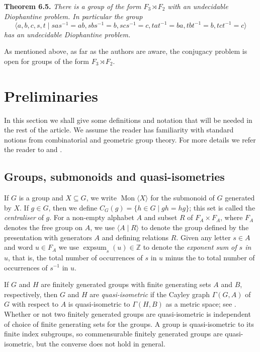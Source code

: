 \documentclass[11pt]{amsart}
\theoremstyle{definition}
\numberwithin{theorem}{section}
\DeclareMathOperator{\Mon}{Mon}
\DeclareMathOperator{\expsum}{expsum}
\begin{document}
\textbf{Theorem 6.5.}
\emph{There is a group of the form $F_3 \rtimes F_2$ with an undecidable Diophantine problem. In particular the group
\[
\langle a, b,c, s, t \mid sas^{-1} = ab, sbs^{-1} = b, scs^{-1} = c, tat^{-1} = ba, tbt^{-1} = b, tct^{-1} = c \rangle
\]
has an undecidable Diophantine problem.}

As mentioned above, as far as the authors are aware, the conjugacy problem is open for groups of the form 
$F_3 \rtimes F_2$. 

\section{Preliminaries}
\label{sec:prelim}

In this section we shall give some definitions and notation that will be needed in the rest of the article. We assume the reader has familiarity with standard notions from combinatorial and geometric group theory. For more details we refer the reader to 
\cite{lyndon1977combinatorial, magnus2004combinatorial} and \cite{delaHarpeBook}.

\subsection{Groups, submonoids and quasi-isometries}
If \(G\) is a group and
	\(X \subseteq G\), we write \(\Mon\langle X \rangle\) for the submonoid
	of \(G\) generated by \(X\). If \(g \in G\), then we define
	\(C_G(g) = \{h \in G \mid gh = hg\}\); this set is called the
	\emph{centraliser} of \(g\).
For a non-empty alphabet $A$ and subset $R$ of $F_A \times F_A$, where $F_A$ denotes the free group on $A$, we use $\langle A \mid R \rangle$ to denote the group defined by the presentation with generators $A$ and defining relations $R$.  
Given any letter $s \in A$ and word $u \in F_A$ we use  $\expsum_{s}(u) \in \mathbb{Z}$ to denote the \emph{exponent sum of $s$ in $u$}, that is, the total number of occurrences of $s$ in $u$ minus the to total number of occurrences of $s^{-1}$ in $u$.    

If $G$ and $H$ are finitely generated groups with finite generating sets $A$ and $B$, respectively, then $G$ and $H$ are \emph{quasi-isometric} if the Cayley graph $\Gamma(G,A)$ of $G$ with respect to $A$ is quasi-isometric to $\Gamma(H,B)$ as a metric space; see \cite[Chapter IV]{delaHarpeBook}. Whether or not two finitely generated groups are quasi-isometric is independent of choice of finite generating sets for the groups. A group is quasi-isometric to its finite index subgroups, so commensurable finitely generated groups are quasi-isometric, but the converse does not hold in general.  
\end{document}
